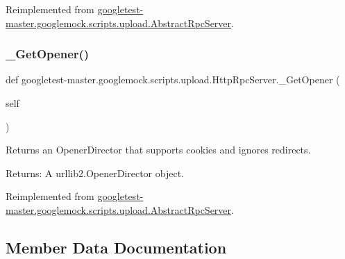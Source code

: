 Reimplemented from \mbox{\hyperlink{classgoogletest-master_1_1googlemock_1_1scripts_1_1upload_1_1_abstract_rpc_server_a5a5c3f303618a625650491e76181ca10}{googletest-\/master.\+googlemock.\+scripts.\+upload.\+Abstract\+Rpc\+Server}}.

\mbox{\label{classgoogletest-master_1_1googlemock_1_1scripts_1_1upload_1_1_http_rpc_server_ac57e60db325e4eb4e75eac9cd6152eeb}} 
\subsubsection{\texorpdfstring{\_GetOpener()}{\_GetOpener()}}
{\footnotesize\ttfamily def googletest-\/master.\+googlemock.\+scripts.\+upload.\+Http\+Rpc\+Server.\+\_\+\+Get\+Opener (\begin{DoxyParamCaption}\item[{}]{self }\end{DoxyParamCaption})\hspace{0.3cm}{\ttfamily [private]}}

\begin{DoxyVerb}Returns an OpenerDirector that supports cookies and ignores redirects.

Returns:
  A urllib2.OpenerDirector object.
\end{DoxyVerb}
 

Reimplemented from \mbox{\hyperlink{classgoogletest-master_1_1googlemock_1_1scripts_1_1upload_1_1_abstract_rpc_server_abffff202772c5ede566f04f2e77d0b08}{googletest-\/master.\+googlemock.\+scripts.\+upload.\+Abstract\+Rpc\+Server}}.



\subsection{Member Data Documentation}
\mbox{\label{classgoogletest-master_1_1googlemock_1_1scripts_1_1upload_1_1_http_rpc_server_a0aa847133239fa6402a3e0b11099f579}} 
